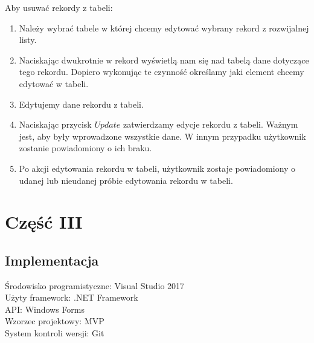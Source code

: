 \documentclass[12pt,a4paper]{article}
\begin{document}
    Aby usuwać rekordy z tabeli:
    \begin{enumerate}
        \item Należy wybrać tabele w której chcemy edytować wybrany rekord z rozwijalnej listy.
        \item Naciskając dwukrotnie w rekord wyświetlą nam się nad tabelą dane dotyczące tego rekordu. Dopiero wykonując te czynność określamy jaki element chcemy edytować w tabeli.
        \item Edytujemy dane rekordu z tabeli. 
        \item Naciskając przycisk $Update$ zatwierdzamy edycje rekordu z tabeli. Ważnym jest, aby były wprowadzone wszystkie dane. W innym przypadku użytkownik zostanie powiadomiony o ich braku.
        \item Po akcji edytowania rekordu w tabeli, użytkownik zostaje powiadomiony o udanej lub nieudanej próbie edytowania rekordu w tabeli.
    \end{enumerate}

    \newpage

    \section{Część III}
    \subsection{Implementacja}
    Środowisko programistyczne: Visual Studio 2017 \\
    Użyty framework: .NET Framework \\
    API: Windows Forms \\
    Wzorzec projektowy: MVP \\
    System kontroli wersji: Git \\
\end{document}
